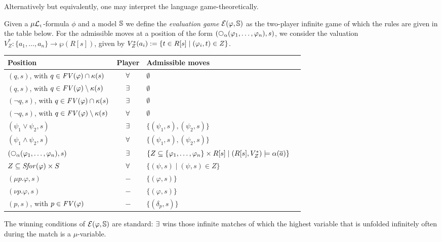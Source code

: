 Alternatively but equivalently, one may interpret the language
game-theoretically.

\begin{definition}
Given a $\mu\mathcal{L}_{\scriptscriptstyle 1}$-formula $\phi$ and a model $\mathbb{S}$ we define the 
\emph{evaluation game} $\mathcal{E}(\varphi,\mathbb{S})$ as the two-player infinite
game of which the rules are given in the table below.
For the admissible moves at a position of the form 
$(\nxt{\al}(\varphi_{1},\ldots,\varphi_{n}),s)$, we consider the valuation 
$V^{*}_{Z}: \{ a_{1}, \ldots, a_{n} \} \to \wp(R[s])$, given by
$V^{*}_{Z}(a_{i}) \mathrel{:=} \{ t \in R[s] \mid (\varphi_{i},t) \in Z \}$.
%
\begin{table}[htb]
\centering
\begin{tabular}{|l|c|l|c|}
\hline
Position & Player & Admissible moves
\\\hline
    $(q,s)$, with $q \in \mathit{FV}(\varphi) \cap \kappa(s)$ 
  & $\forall$ 
  & $\emptyset$
\\  $(q,s)$, with $q \in \mathit{FV}(\varphi) \setminus \kappa(s)$ 
  & $\exists$ & $\emptyset$
\\  $(\lnot q,s)$, with $q \in \mathit{FV}(\varphi) \cap \kappa(s)$ 
  & $\exists$ 
  & $\emptyset$
\\  $(\lnot q,s)$, with $q \in \mathit{FV}(\varphi) \setminus \kappa(s)$ 
  & $\forall$ 
  & $\emptyset$
\\ $(\psi_1 \lor \psi_2,s)$ 
  & $\exists$ 
  & $\{(\psi_1,s),(\psi_2,s) \}$ 
\\  $(\psi_1 \land \psi_2,s)$ 
  & $\forall$ 
  & $\{(\psi_1,s),(\psi_2,s) \}$ 
\\  $(\nxt{\al}(\varphi_{1},\ldots,\varphi_{n}),s)$ 
  & $\exists$ 
  & $\{ Z \subseteq \{ \varphi_{1},\ldots,\varphi_{n} \} \times R[s]
     \mid (R[s],V^{*}_{Z}) \models \alpha(\overline{a}) \}$ 
\\  $Z \subseteq  \mathit{Sfor}(\varphi) \times S$
  & $\forall$
  & $\{ (\psi, s) \mid (\psi,s) \in Z \}$
\\  $(\mu p.\varphi,s)$ & $-$ & $\{(\varphi,s) \}$ 
\\  $(\nu p.\varphi,s)$ & $-$ & $\{(\varphi,s) \}$ 
\\  $(p,s)$, with $p \in \mathit{FV}(\varphi)$ & $-$ & $\{(\delta_p,s) \}$ \\
  \hline
\end{tabular}
\label{tab:EGL}
\end{table}
The winning conditions of $\mathcal{E}(\varphi,\mathbb{S})$ are standard: $\exists$ wins
those infinite matches of which the highest variable that is unfolded infinitely
often during the match is a $\mu$-variable.
\end{definition}

